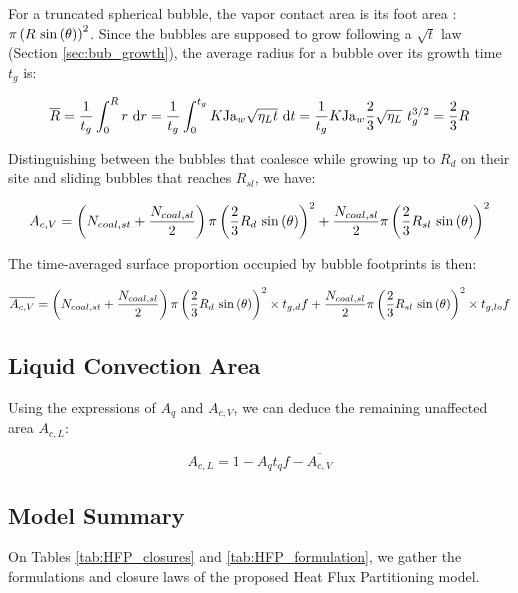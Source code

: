 For a truncated spherical bubble, the vapor contact area is its foot area : $\pi  \left( R~\mathrm{sin}\left( \theta \right) \right)^{2}$. Since the bubbles are supposed to grow following a $\sqrt{t}$ law (Section \ref{sec:bub_growth}), the average radius for a bubble over its growth time $t_{g}$ is:

\begin{equation}
\overline{R} = \frac{1}{t_{g}}\int_{0}^{R}r\ \mathrm{d}r = \frac{1}{t_{g}} \int_{0}^{t_{g}} K\mathrm{Ja}_{w}\sqrt{\eta_{L}t}~\mathrm{d}t = \frac{1}{t_{g}} K\mathrm{Ja}_{w} \frac{2}{3}\sqrt{\eta_{L}}~t_{g}^{3/2} = \frac{2}{3}R
\end{equation}

Distinguishing between the bubbles that coalesce while growing up to $R_{d}$ on their site and sliding bubbles that reaches $R_{sl}$, we have:

\begin{equation}
A_{c,V} = \parth{N_{coal,st} + \dfrac{N_{coal,sl}}{2}}\pi \parth{\dfrac{2}{3}R_{d}\ \sin{\theta}}^{2} + \dfrac{N_{coal,sl}}{2}\pi \parth{\dfrac{2}{3}R_{sl}\ \sin{\theta}}^{2}
\end{equation}

The time-averaged surface proportion occupied by bubble footprints is then:

\begin{equation}
\overline{A_{c,V}} =  \parth{N_{coal,st} + \dfrac{N_{coal,sl}}{2}}\pi \parth{\dfrac{2}{3}R_{d}\ \sin{\theta}}^{2} \times t_{g,d}f + \dfrac{N_{coal,sl}}{2}\pi \parth{\dfrac{2}{3}R_{sl}\ \sin{\theta}}^{2} \times t_{g,lo} f
\end{equation}


\subsection{Liquid Convection Area}

Using the expressions of $A_{q}$ and $A_{c,V}$, we can deduce the remaining unaffected area $A_{c,L}$:

\begin{equation}
A_{c,L} = 1 - A_{q}t_{q}f - \overline{A_{c,V}}
\end{equation}

\subsection{Model Summary}

On Tables \ref{tab:HFP_closures} and \ref{tab:HFP_formulation}, we gather the formulations and closure laws of the proposed Heat Flux Partitioning model.

